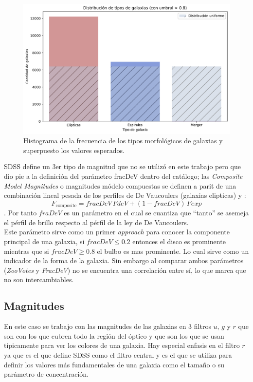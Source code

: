 \documentclass[twocolumn]{article}
\begin{document}
\begin{figure}[ht]
\includegraphics[width=\linewidth]{morfologia.pdf}
\caption{Histograma de la frecuencia de los tipos morfológicos de galaxias y superpuesto los valores esperados.}
\label{fig:morf}
\end{figure}
SDSS define un 3er tipo de magnitud que no se utilizó en este trabajo pero que dio pie a la definición del parámetro fracDeV dentro del catálogo; las \textit{Composite Model Magnitudes} o magnitudes módelo compuestas se definen a parit de una combinación lineal pesada de los perfiles de De Vaucoulers (galaxias elipticas) y : \[F_{\text{composite}} = fracDeV \,FdeV + (1 - fracDeV)\,Fexp\]. 
Por tanto $fraDeV$ es un parámetro en el cual se cuantiza que ``tanto'' se asemeja el pérfil de brillo respecto al pérfil de la ley de De Vaucoulers.\\
Este parámetro sirve como un primer \textit{approach} para conocer la componente principal de una galaxia, si $fracDeV \leq 0.2$ entonces el disco es prominente mientras que si $fracDeV \geq 0.8$ el bulbo es mas prominente. Lo cual sirve como un indicador de la forma de la galaxia.
Sin embargo al comparar ambos parámetros (\textit{ZooVotes} y \textit{FracDeV}) no se encuentra una correlación entre sí, lo que marca que no son intercambiables. 


\subsection{Magnitudes}
En este caso se trabajo con las magnitudes de las galaxias en 3 filtros $u$, $g$ y $r$ que son con los que cubren todo la región del óptico y que son los que se usan tipicamente para ver los colores de una galaxia. Hay especial enfasis en el filtro $r$ ya que es el que define SDSS como el filtro central y es el que se utiliza para definir los valores más fundamentales de una galaxia como el tamaño o su parámetro de concentración.
\end{document}
